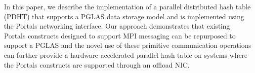 
In this paper, we describe the implementation of a parallel distributed hash
table (PDHT) that supports a PGLAS data storage model and is implemented using
the Portals networking interface.  Our approach demonstrates that existing
Portals constructs designed to support MPI messaging can be repurposed to
support a PGLAS and the novel use of these primitive communication operations
can further provide a hardware-accelerated parallel hash table on systems where
the Portals constructs are supported through an offload NIC.


